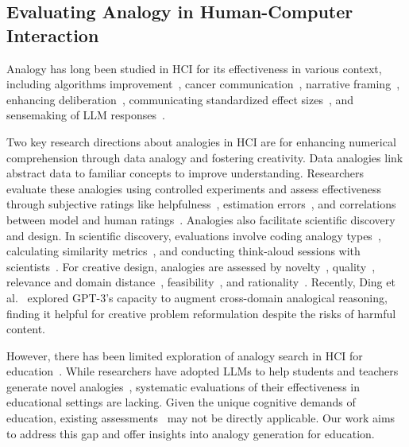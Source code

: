 \subsection{Evaluating Analogy in Human-Computer Interaction}
Analogy has long been studied in HCI for its effectiveness in various context, including algorithms improvement~\cite{bureaucracy2020Pääkkönen,streetlevel2019Alkhatib}, cancer communication~\cite{capturing2024hnatyshyn}, narrative framing~\cite{reelframer2024wang}, enhancing deliberation~\cite{help2024yeo}, communicating standardized effect sizes~\cite{putting2022kim}, and sensemaking of LLM responses~\cite{supporting2024gero}.

Two key research directions about analogies in HCI are for enhancing numerical comprehension through data analogy and fostering creativity.
Data analogies link abstract data to familiar concepts to improve understanding. Researchers evaluate these analogies using controlled experiments and assess effectiveness through subjective ratings like helpfulness~\cite{toput2018riederer, improving2018hullman, generating2016kim, spatharioti_using_2024, chen_beyond_2024}, estimation errors~\cite{toput2018riederer, improving2018hullman}, and correlations between model and human ratings~\cite{spatharioti_using_2024}.
Analogies also facilitate scientific discovery and design. 
In scientific discovery, evaluations involve coding analogy types~\cite{solvent2018chan, kang_augmenting_2022}, calculating similarity metrics~\cite{solvent2018chan}, and conducting think-aloud sessions with scientists~\cite{kang_augmenting_2022}. 
For creative design, analogies are assessed by novelty~\cite{searching2014yu, bilogically2023zhu, bidtrainer2024chen}, quality~\cite{distributed2014yu, bidtrainer2024chen}, relevance and domain distance~\cite{analogymining2018Gilon}, feasibility~\cite{bilogically2023zhu}, and rationality~\cite{bidtrainer2024chen}.
Recently, Ding et al.~\cite{ding_fluid_2023} explored GPT-3's capacity to augment cross-domain analogical reasoning, finding it helpful for creative problem reformulation despite the risks of harmful content.

However, there has been limited exploration of analogy search in HCI for education~\cite{kumar2015stickipedia}. 
While researchers have adopted LLMs to help students and teachers generate novel analogies~\cite{bhavya2024analego}, systematic evaluations of their effectiveness in educational settings are lacking. 
Given the unique cognitive demands of education, existing assessments~\cite{ding_fluid_2023} may not be directly applicable. 
Our work aims to address this gap and offer insights into analogy generation for education.




